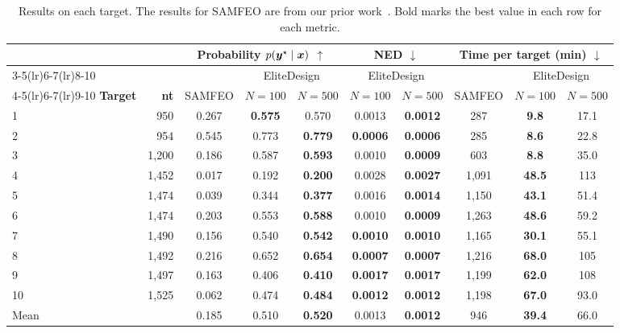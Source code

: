 \begin{table}[H]
\centering
\renewcommand{\arraystretch}{1.15}
\setlength{\tabcolsep}{5pt}
\begin{tabular}{@{}lr|ccc|cc|ccc@{}}
\toprule
& & \multicolumn{3}{c|}{\textbf{Probability} $p(\boldsymbol{{y}}^\star\mid\boldsymbol{{x}})$ $\uparrow$} & \multicolumn{2}{c|}{\textbf{NED} $\downarrow$} & \multicolumn{3}{c}{\textbf{Time per target (min)} $\downarrow$} \\
\cmidrule(lr){3-5}\cmidrule(lr){6-7}\cmidrule(lr){8-10}
& & & \multicolumn{2}{c|}{EliteDesign} & \multicolumn{2}{c|}{EliteDesign} & & \multicolumn{2}{c}{EliteDesign} \\
\cmidrule(lr){4-5}\cmidrule(lr){6-7}\cmidrule(lr){9-10}
\textbf{Target} & \textbf{nt} & SAMFEO & $N{=}100$ & $N{=}500$ & $N{=}100$ & $N{=}500$ & SAMFEO & $N{=}100$ & $N{=}500$ \\
\midrule
1 & 950 & 0.267 & \textbf{0.575} & 0.570 & 0.0013 & \textbf{0.0012} & 287 & \textbf{9.8} & 17.1 \\
2 & 954 & 0.545 & 0.773 & \textbf{0.779} & \textbf{0.0006} & \textbf{0.0006} & 285 & \textbf{8.6} & 22.8 \\
3 & 1,200 & 0.186 & 0.587 & \textbf{0.593} & 0.0010 & \textbf{0.0009} & 603 & \textbf{8.8} & 35.0 \\
4 & 1,452 & 0.017 & 0.192 & \textbf{0.200} & 0.0028 & \textbf{0.0027} & 1,091 & \textbf{48.5} & 113 \\
5 & 1,474 & 0.039 & 0.344 & \textbf{0.377} & 0.0016 & \textbf{0.0014} & 1,150 & \textbf{43.1} & 51.4 \\
6 & 1,474 & 0.203 & 0.553 & \textbf{0.588} & 0.0010 & \textbf{0.0009} & 1,263 & \textbf{48.6} & 59.2 \\
7 & 1,490 & 0.156 & 0.540 & \textbf{0.542} & \textbf{0.0010} & \textbf{0.0010} & 1,165 & \textbf{30.1} & 55.1 \\
8 & 1,492 & 0.216 & 0.652 & \textbf{0.654} & \textbf{0.0007} & \textbf{0.0007} & 1,216 & \textbf{68.0} & 105 \\
9 & 1,497 & 0.163 & 0.406 & \textbf{0.410} & \textbf{0.0017} & \textbf{0.0017} & 1,199 & \textbf{62.0} & 108 \\
10 & 1,525 & 0.062 & 0.474 & \textbf{0.484} & \textbf{0.0012} & \textbf{0.0012} & 1,198 & \textbf{67.0} & 93.0 \\
\midrule
Mean & & 0.185 & 0.510 & \textbf{0.520} & 0.0013 & \textbf{0.0012} & 946 & \textbf{39.4} & 66.0 \\
\bottomrule
\end{tabular}
\caption{Results on each \sixteenS{} target. The results for SAMFEO are from our prior work~\citep{zhou2026fastdesign}. Bold marks the best value in each row for each metric.}
\label{tab:supp-16s-pertarget}
\end{table}
